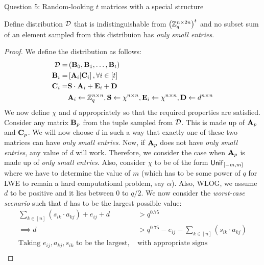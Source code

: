 \begin{solution}{Question 5: Random-looking $t$ matrices with a special structure}\label{ques:5}
    \begin{question}
        Define distribution $\mathcal{D}$ that is indistinguishable from $\left(\mathbb{Z}_q^{n\times 2n}\right)^t$ and no subset sum of an element sampled from this distribuion has \textit{only small entries}.
    \end{question}
    \tcblower{}
    \begin{proof}
        We define the distribution as follows:
        \begin{equation}
            \begin{split}
                \mathcal{D} = &\left(\mathbf{B}_0, \mathbf{B}_1, \ldots, \mathbf{B}_t\right)\\
                \mathbf{B}_i = &\left[\mathbf{A}_i | \mathbf{C}_i\right], \forall i\in [t]\\
                \mathbf{C}_i = &\mathbf{S}\cdot\mathbf{A}_i + \mathbf{E}_i + \mathbf{D}\\
                &\mathbf{A}_i\gets\mathbb{Z}_q^{n\times n}, \mathbf{S}\gets\chi^{n\times n}, \mathbf{E}_i\gets\chi^{n\times n}, \mathbf{D}\gets d^{n\times n}
            \end{split}
        \end{equation}
        We now define $\chi$ and $d$ appropriately so that the required properties are satisfied. Consider any matrix $\mathbf{B}_p$ from the tuple sampled from $\mathcal{D}$. This is made up of $\mathbf{A}_p$ and $\mathbf{C}_p$. We will now choose $d$ in such a way that exactly one of these two matrices can have \textit{only small entries}. Now, if $\mathbf{A}_p$ does not have \textit{only small entries}, any value of $d$ will work. Therefore, we consider the case when $\mathbf{A}_p$ is made up of \textit{only small entries}. Also, consider $\chi$ to be of the form $\mathsf{Unif}_{\left[-m, m\right]}$ where we have to determine the value of $m$ (which has to be some power of $q$ for LWE to remain a hard computational problem, say $\alpha$). Also, WLOG, we assume $d$ to be positive and it lies between $0$ to $q/2$. We now consider the \textit{worst-case scenario} such that $d$ has to be the largest possible value:
        \begin{equation}
            \begin{split}
                \sum_{k\in[n]}\left(s_{ik}\cdot a_{kj}\right) + e_{ij} + d &> q^{0.75}\\
                \implies d &> q^{0.75} - e_{ij} - \sum_{k\in[n]}\left(s_{ik}\cdot a_{kj}\right)\\
                \text{Taking }e_{ij}, a_{kj}, s_{ik}\text{ to be the largest, }&\text{with appropriate signs}\\

\end{split}
\end{equation}
\end{proof}
\end{solution}
